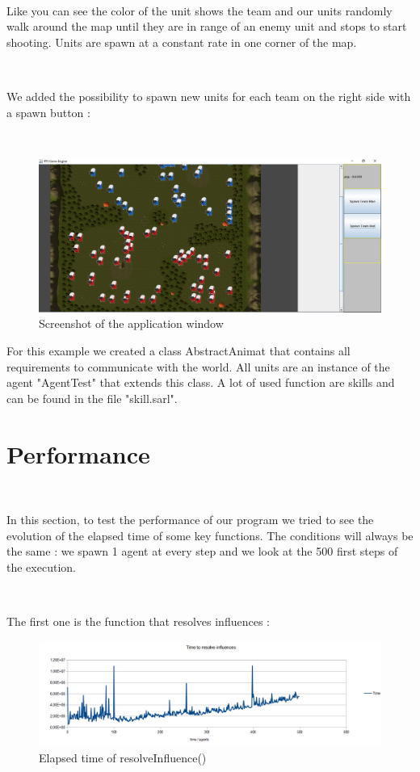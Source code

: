 \documentclass[a4paper,10pt]{book}
\begin{document}
~

Like you can see the color of the unit shows the team and our units randomly walk around the map until they are in range of an enemy unit and stops to start shooting. Units are spawn at a constant rate in one corner of the map.

~

We added the possibility to spawn new units for each team on the right side with a spawn button :

~

\begin{figure}[h]
 \centering
 \includegraphics[scale=0.5]{GUI3}
 \caption{Screenshot of the application window}
\end{figure}

For this example we created a class AbstractAnimat that contains all requirements to communicate with the world. All units are an instance of the agent "AgentTest" that extends this class. A lot of used function are skills and can be found in the file "skill.sarl".

\newpage

\chapter {Performance}

~

In this section, to test the performance of our program we tried to see the evolution of the elapsed time of some key functions. The conditions will always be the same : we spawn 1 agent at every step and we look at the 500 first steps of the execution.

~

The first one is the function that resolves influences :

\begin{figure}[h]
 \centering
 \includegraphics[scale=0.5]{resolveInfluence}
 \caption{Elapsed time of resolveInfluence()}
\end{figure}
\end{document}
